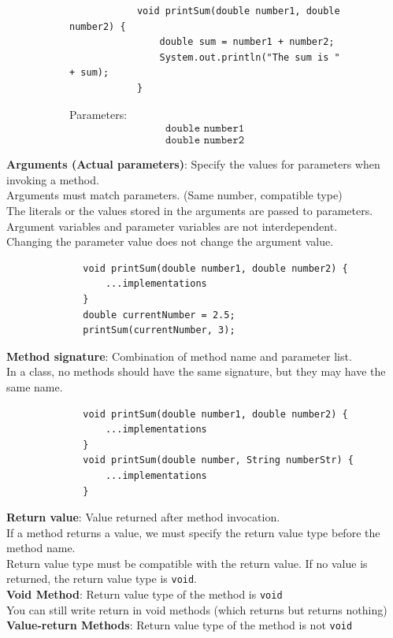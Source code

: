 \documentclass{article}
\begin{document}
\begin{figure}[h!]
	\begin{subfigure}[h]{.6\textwidth}
		\centering
		\begin{verbatim}
			void printSum(double number1, double number2) {
			    double sum = number1 + number2;
			    System.out.println("The sum is " + sum);
			}
		\end{verbatim}
	\end{subfigure}
	\begin{subfigure}[h]{.3\textwidth}
		Parameters:
		\begin{align*}
			\texttt{double number1}\\
			\texttt{double number2}
		\end{align*}
	\end{subfigure}
\end{figure}

\textbf{Arguments (Actual parameters)}: Specify the values for parameters when invoking a method.\\
Arguments must match parameters. (Same number, compatible type)\\
The literals or the values stored in the arguments are passed to parameters.\\
Argument variables and parameter variables are not interdependent.\\
Changing the parameter value does not change the argument value.

\begin{figure}[h]
	\centering
	\begin{verbatim}
		void printSum(double number1, double number2) {
		    ...implementations
		}
		double currentNumber = 2.5;
		printSum(currentNumber, 3);
	\end{verbatim}
\end{figure}

\textbf{Method signature}: Combination of method name and parameter list.\\
In a class, no methods should have the same signature, but they may have the same name.

\begin{figure}[h!]
	\centering
	\begin{verbatim}
		void printSum(double number1, double number2) {
			...implementations
		}
		void printSum(double number, String numberStr) {
		    ...implementations
		}
	\end{verbatim}
\end{figure}
\newpage

\textbf{Return value}: Value returned after method invocation.\\
If a method returns a value, we must specify the return value type before the method name.\\
Return value type must be compatible with the return value. If no value is returned, the return value type is \texttt{void}.\\
\textbf{Void Method}: Return value type of the method is \texttt{void}\\
You can still write return in void methods (which returns but returns nothing)\\
\textbf{Value-return Methods}: Return value type of the method is not \texttt{void}
\end{document}
